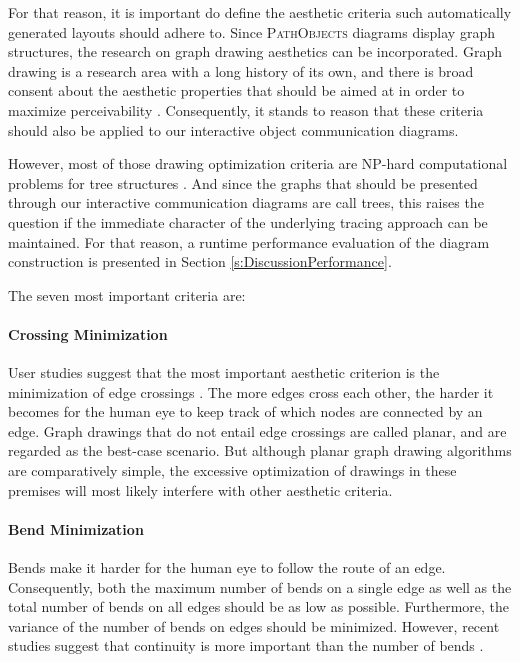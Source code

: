 For that reason, it is important do define the aesthetic criteria such automatically generated layouts should adhere to.
Since \textsc{PathObjects} diagrams display graph structures, the research on graph drawing aesthetics can be incorporated.
Graph drawing is a research area with a long history of its own, and there is broad consent about the aesthetic properties that should be aimed at in order to maximize perceivability \cite{battista_graph_1998, kaufmann_drawing_2001, diehl_software_2007}.
Consequently, it stands to reason that these criteria should also be applied to our interactive object communication diagrams.

However, most of those drawing optimization criteria are NP-hard computational problems for tree structures \cite{battista_graph_1998}.
And since the graphs that should be presented through our interactive communication diagrams are call trees, this raises the question if the immediate character of the underlying tracing approach can be maintained.
For that reason, a runtime performance evaluation of the diagram construction is presented in Section \ref{s:DiscussionPerformance}.

The seven most important criteria are:

\paragraph{Crossing Minimization} User studies suggest that the most important aesthetic criterion is the minimization of edge crossings \cite{purchase_effective_2000, purchase_graph_2004, purchase_graph_2010}.
The more edges cross each other, the harder it becomes for the human eye to keep track of which nodes are connected by an edge.
Graph drawings that do not entail edge crossings are called planar, and are regarded as the best-case scenario.
But although planar graph drawing algorithms are comparatively simple, the excessive optimization of drawings in these premises will most likely interfere with other aesthetic criteria.

\paragraph{Bend Minimization} Bends make it harder for the human eye to follow the route of an edge.
Consequently, both the maximum number of bends on a single edge as well as the total number of bends on all edges should be as low as possible.
Furthermore, the variance of the number of bends on edges should be minimized.
However, recent studies suggest that continuity is more important than the number of bends \cite{diehl_software_2007}.

